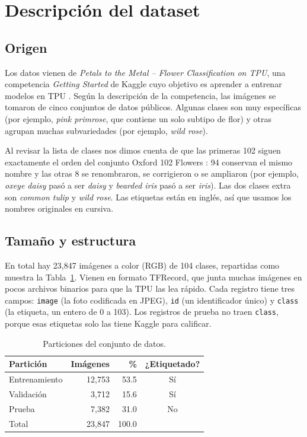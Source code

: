 \section{Descripción del dataset}
\subsection{Origen}
Los datos vienen de \textit{Petals to the Metal -- Flower Classification on TPU}, una competencia \textit{Getting Started} de Kaggle cuyo objetivo es aprender a entrenar modelos en TPU \parencite{kagglePetalsMetal}. Según la descripción de la competencia, las imágenes se tomaron de cinco conjuntos de datos públicos. Algunas clases son muy específicas (por ejemplo, \textit{pink primrose}, que contiene un solo subtipo de flor) y otras agrupan muchas subvariedades (por ejemplo, \textit{wild rose}).

Al revisar la lista de clases nos dimos cuenta de que las primeras 102 siguen exactamente el orden del conjunto Oxford 102 Flowers \parencite{nilsback2008}: 94 conservan el mismo nombre y las otras 8 se renombraron, se corrigieron o se ampliaron (por ejemplo, \textit{oxeye daisy} pasó a ser \textit{daisy} y \textit{bearded iris} pasó a ser \textit{iris}). Las dos clases extra son \textit{common tulip} y \textit{wild rose}. Las etiquetas están en inglés, así que usamos los nombres originales en cursiva.

\subsection{Tamaño y estructura}
En total hay 23,847 imágenes a color (RGB) de 104 clases, repartidas como muestra la Tabla~\ref{tab:particiones}. Vienen en formato TFRecord, que junta muchas imágenes en pocos archivos binarios para que la TPU las lea rápido. Cada registro tiene tres campos: \texttt{image} (la foto codificada en JPEG), \texttt{id} (un identificador único) y \texttt{class} (la etiqueta, un entero de 0 a 103). Los registros de prueba no traen \texttt{class}, porque esas etiquetas solo las tiene Kaggle para calificar.

\begin{table}[htbp]
\centering
\caption{Particiones del conjunto de datos.}
\label{tab:particiones}
\small
\begin{tabular}{lrrc}
\toprule
Partición & Imágenes & \% & ¿Etiquetado? \\
\midrule
Entrenamiento & 12,753 & 53.5 & Sí \\
Validación    &  3,712 & 15.6 & Sí \\
Prueba        &  7,382 & 31.0 & No \\
\midrule
Total         & 23,847 & 100.0 & \\
\bottomrule
\end{tabular}
\end{table}

